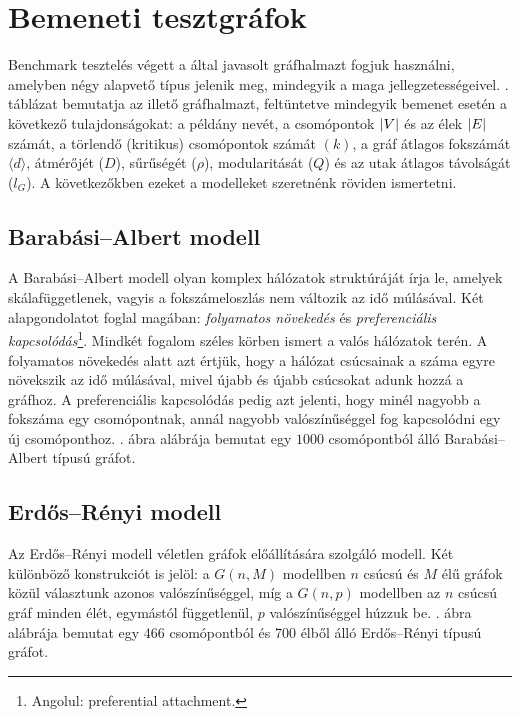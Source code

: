 \section{Bemeneti tesztgráfok}\label{sec:BENCHMARK-PROBLEM-INSTANCES}
Benchmark tesztelés végett a  által javasolt gráfhalmazt fogjuk használni, amelyben négy alapvető típus jelenik meg, mindegyik a maga jellegzetességeivel.
. táblázat bemutatja az illető gráfhalmazt, feltüntetve mindegyik bemenet esetén a következő tulajdonságokat:
a példány nevét, a csomópontok $\lvert V\rvert$ és az élek $\lvert E\rvert$ számát, a törlendő (kritikus) csomópontok számát $\left( k \right)$,
a gráf átlagos fokszámát $\langle d \rangle$, átmérőjét ($D$), sűrűségét ($\rho$), modularitását ($Q$) és az utak átlagos távolságát ($l_G$).
A következőkben ezeket a modelleket szeretnénk röviden ismertetni.


\subsection{Barabási–Albert modell}
A Barabási–Albert modell olyan komplex hálózatok struktúráját írja le, amelyek skálafüggetlenek, vagyis a fokszámeloszlás nem változik az idő múlásával.
Két alapgondolatot foglal magában: \textit{folyamatos növekedés} és \textit{preferenciális kapcsolódás}\footnote{ Angolul: preferential attachment. }. Mindkét fogalom széles körben ismert a valós hálózatok terén.
A folyamatos növekedés alatt azt értjük, hogy a hálózat csúcsainak a száma egyre növekszik az idő múlásával, mivel újabb és újabb csúcsokat adunk hozzá a gráfhoz.
A preferenciális kapcsolódás pedig azt jelenti, hogy minél nagyobb a fokszáma egy csomópontnak, annál nagyobb valószínűséggel fog kapcsolódni egy új csomóponthoz.
. ábra  alábrája bemutat egy $1000$ csomópontból álló Barabási–Albert típusú gráfot.


\subsection{Erdős–Rényi modell}
Az Erdős–Rényi modell véletlen gráfok előállítására szolgáló modell. Két különböző konstrukciót is jelöl:
a $G(n, M)$ modellben $n$ csúcsú és $M$ élű gráfok közül választunk azonos valószínűséggel,
míg a $G(n, p)$ modellben az $n$ csúcsú gráf minden élét, egymástól függetlenül, $p$ valószínűséggel húzzuk be.
. ábra  alábrája bemutat egy $466$ csomópontból és 700 élből álló Erdős–Rényi típusú gráfot.


